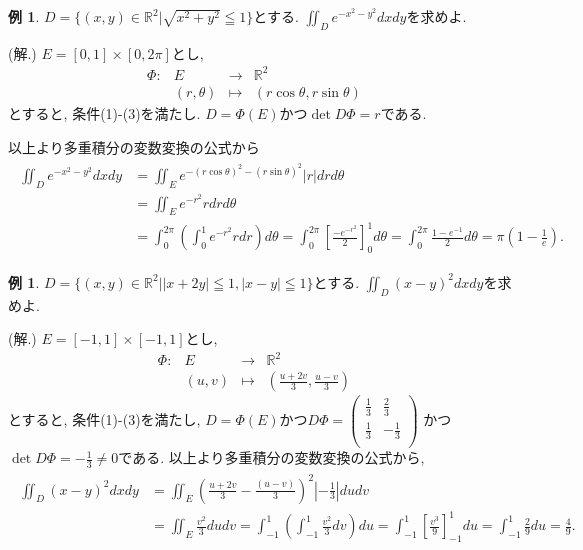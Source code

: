 \documentclass[dvipdfmx,a4paper,11pt]{article}
\newcommand{\R}{\mathbb{R}}
\theoremstyle{definition}
\newtheorem{exa}[thm]{例}
\begin{document}
\begin{exa}
$D= \{ (x,y)\in \R^2 | \sqrt{x^2 + y^2 } \leqq 1  \}$とする. 
$\iint_{D} e^{-x^2-y^2}dxdy$を求めよ.

\hspace{-11pt}(解.) 
$E=[0,1]\times[0,2\pi]$とし, 
 $$
\begin{array}{ccccc}
\Phi: &E & \rightarrow & \R^2 & \\
&(r,\theta) & \longmapsto & (r \cos \theta , r \sin \theta)&
\end{array}
$$
とすると, 条件(1)-(3)を満たし. $D = \Phi(E)$かつ$\det D\Phi =r$である.

以上より多重積分の変数変換の公式から
\begin{align*}
\begin{split}
\iint_{D} e^{-x^2-y^2}dxdy
&=
\iint_{E} e^{-(r \cos \theta )^2- (r \sin \theta )^2} |r|drd\theta \\
&=
\iint_{E} e^{-r^2}r drd\theta \\
&=
\int_{0}^{2\pi} \left( \int_{0}^{1}e^{-r^2}r dr\right)d\theta 
=\int_{0}^{2\pi} \left[ \frac{-e^{-r^2}}{2} \right]_{0}^{1} d\theta 
=\int_{0}^{2\pi} \frac{1-e^{-1}}{2} d\theta =\pi\left( 1-\frac{1}{e}\right).
    \end{split}
  \end{align*}
\end{exa}

\begin{exa}
$D= \{ (x,y)\in \R^2 |  |x+2y|\leqq1, |x-y|\leqq1 \}$とする. 
$\iint_{D} (x-y)^2dxdy$を求めよ.

\hspace{-11pt}(解.) 
$E=[-1,1]\times[-1,1]$とし, 
 $$
\begin{array}{ccccc}
\Phi: &E & \rightarrow & \R^2 & \\
&(u,v) & \longmapsto & (\frac{u+2v}{3} , \frac{u-v}{3} )&
\end{array}
$$
とすると, 条件(1)-(3)を満たし, 
$D = \Phi(E)$かつ$
D\Phi=
\left(\begin{array}{cc} \frac{1}{3} &\frac{2}{3} \\ \frac{1}{3}&-\frac{1}{3} \\ \end{array} \right)
$
かつ$\det D\Phi = -\frac{1}{3}\neq 0$である.
以上より多重積分の変数変換の公式から, 
\begin{align*}
\begin{split}
\iint_{D} (x-y)^2dxdy
&=
\iint_{E} \left(  \frac{u+2v}{3} - \frac{(u-v)}{3} \right)^2 \left| -\frac{1}{3}\right| dudv \\
&= 
\iint_{E} \frac{v^2}{3} dudv
=
\int_{-1}^{1} \left( \int_{-1}^{1} \frac{v^2}{3} dv\right)du 
=
\int_{-1}^{1} \left[ \frac{v^3}{9}\right]_{-1}^{1} du
=\int_{-1}^{1}  \frac{2}{9} du
=\frac{4}{9}. 
 \end{split}
  \end{align*}
 \end{exa}
\end{document}
